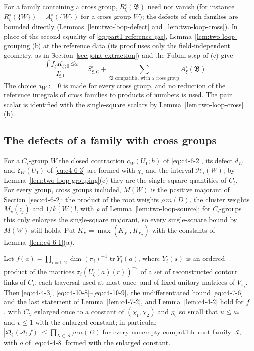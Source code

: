 For a family containing a cross group, $R^\circ_\xi(\mathfrak B)$ need not vanish (for instance $R^\circ_\xi(\{W\})=A^\circ_\xi(\{W\})$ for a cross group $W$); the defects of such families are bounded directly (Lemmas~\ref{lem:two-loop-defect} and~\ref{lem:two-loop-cross}). In place of the second equality of \eqref{eq:part1-reference-gas}, Lemma~\ref{lem:two-loop-grouping}(b) at the reference data (its proof uses only the field-independent geometry, as in Section~\ref{sec:joint-extraction}) and the Fubini step of (c) give
\[
    \frac{\int f^\circ_\xi K^\circ_{\xi;0}\,\dd a}{I^\circ_{\xi;0}}=S^\circ_{\xi,C}+\sum_{\mathfrak B\text{ compatible, with a cross group}}A^\circ_\xi(\mathfrak B)\;.
\]
The choice $a_W:=0$ is made for every cross group, and no reduction of the reference integrals of cross families to products of numbers is used. The pair scalar is identified with the single-square scalars by Lemma~\ref{lem:two-loop-cross}(b).

\subsection{The defects of a family with cross groups}\label{sec:two-loops-defects}
For a $C_i$-group $W$ the closed contraction $c_W(U_1;h)$ of \eqref{eq:c4-6-2}, its defect $d_W$ and $\mathfrak d_W(U_1)$ of \eqref{eq:c4-6-3} are formed with $\chi_i$ and the interval $\mathcal H_i(W)$; by Lemma~\ref{lem:two-loop-grouping}(c) they are the single-square quantities of $C_i$. For every group, cross groups included, $M(W)$ is the positive majorant of Section~\ref{sec:c4-6-2}: the product of the root weights $\rho\,m(D)$, the cluster weights $M_v(\mathfrak c_j)$ and $1/k(W)!$, with $\rho$ of Lemma~\ref{lem:two-loop-source}; for $C_i$-groups this only enlarges the single-square majorant, so every single-square bound by $M(W)$ still holds. Put $K_\chi=\max(K_{\chi_1},K_{\chi_2})$ with the constants of Lemma~\ref{lem:c4-6-1}(a).

\begin{lemma}\label{lem:two-loop-source}
Let $f(a)=\prod_{i=1,2}\dim(\pi_i)^{-1}\operatorname{tr}Y_i(a)$, where $Y_i(a)$ is an ordered product of the matrices $\pi_i(U_\xi(a)(r))^{\pm1}$ of a set of reconstructed contour links of $C_i$, each traversal used at most once, and of fixed unitary matrices of $V_{\pi_i}$. Then \eqref{eq:c4-4-3}, \eqref{eq:c4-10-8}--\eqref{eq:c4-10-9}, the undifferentiated bound \eqref{eq:c4-7-6} and the last statement of Lemma~\ref{lem:c4-7-2}, and Lemma~\ref{lem:c4-4-2} hold for $f$, with $C_\chi$ enlarged once to a constant of $(\chi_1,\chi_2)$ and $g_0$ so small that $u\leq u_*$ and $v\leq1$ with the enlarged constant; in particular $|\mathfrak Q_\xi(\mathcal A;f)|\leq\prod_{D\in\mathcal A}\rho\,m(D)$ for every nonempty compatible root family $\mathcal A$, with $\rho$ of \eqref{eq:c4-4-8} formed with the enlarged constant.
\end{lemma}

